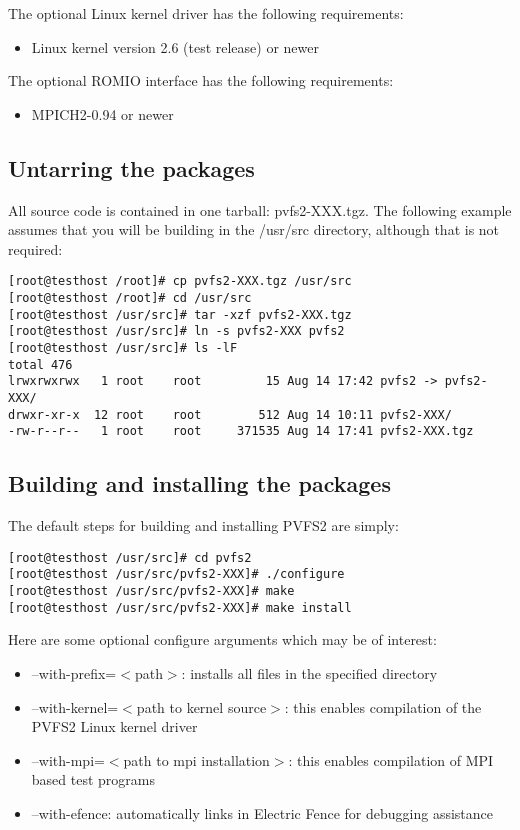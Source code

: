 \documentclass[11pt, letterpaper]{article}
\begin{document}
The optional Linux kernel driver has the following requirements:
\begin{itemize}
\item Linux kernel version 2.6 (test release) or newer
\end{itemize}

The optional ROMIO interface has the following requirements:
\begin{itemize}
\item MPICH2-0.94 or newer
\end{itemize}

\subsection{Untarring the packages}

All source code is contained in one tarball: pvfs2-XXX.tgz.  The following example assumes that you will be building in the /usr/src directory, although that is not required:

\begin{verbatim}
[root@testhost /root]# cp pvfs2-XXX.tgz /usr/src
[root@testhost /root]# cd /usr/src
[root@testhost /usr/src]# tar -xzf pvfs2-XXX.tgz
[root@testhost /usr/src]# ln -s pvfs2-XXX pvfs2
[root@testhost /usr/src]# ls -lF
total 476
lrwxrwxrwx   1 root    root         15 Aug 14 17:42 pvfs2 -> pvfs2-XXX/
drwxr-xr-x  12 root    root        512 Aug 14 10:11 pvfs2-XXX/
-rw-r--r--   1 root    root     371535 Aug 14 17:41 pvfs2-XXX.tgz

\end{verbatim}

\subsection{Building and installing the packages}

The default steps for building and installing PVFS2 are simply:

\begin{verbatim}
[root@testhost /usr/src]# cd pvfs2
[root@testhost /usr/src/pvfs2-XXX]# ./configure
[root@testhost /usr/src/pvfs2-XXX]# make
[root@testhost /usr/src/pvfs2-XXX]# make install
\end{verbatim}

Here are some optional configure arguments which may be of interest:
\begin{itemize}
\item --with-prefix=$<$path$>$: installs all files in the specified directory
\item --with-kernel=$<$path to kernel source$>$: this enables compilation of
the PVFS2 Linux kernel driver
\item --with-mpi=$<$path to mpi installation$>$: this enables compilation of MPI
based test programs
\item --with-efence: automatically links in Electric Fence for debugging assistance
\end{itemize}
\end{document}
